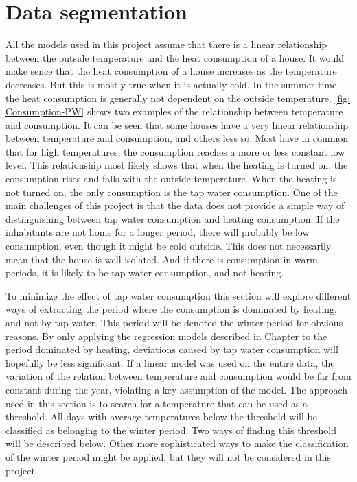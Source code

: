 \section{Data segmentation}
All the models used in this project assume that there is a linear relationship between the outside temperature and the heat consumption of a house. It would make sence that the heat consumption of a house increases as the temperature decreases. But this is mostly true when it is actually cold. In the summer time the heat consumption is generally not dependent on the outside temperature. \cref{fig: Consumption-PW} shows two examples of the relationship between temperature and consumption. It can be seen that some houses have a very linear relationship between temperature and consumption, and others less so. Most have in common that for high temperatures, the consumption reaches a more or less constant low level. This relationship most likely shows that when the heating is turned on, the consumption rises and falls with the outside temperature. When the heating is not turned on, the only consumption is the tap water consumption. One of the main challenges of this project is that the data does not provide a simple way of distinguishing between tap water consumption and heating consumption. If the inhabitants are not home for a longer period, there will probably be low consumption, even though it might be cold outside. This does not necessarily mean that the house is well isolated. And if
there is consumption in warm periods, it is likely to be tap water consumption, and not heating.

\noindent To minimize the effect of tap water consumption this section will explore different ways of extracting the period where the consumption is dominated by heating, and not by tap water. This period will be denoted the winter period for obvious reasons. By only applying the regression models described in Chapter \cite{chap: daily} to the period dominated by heating, deviations caused by tap water consumption will hopefully be less significant. If a linear model was used on the entire data, the variation of the relation between temperature and consumption would be far from constant during the year, violating a key assumption of the model. The approach used in this section is to search for a temperature that can be used as a threshold. All days with average temperatures below the threshold will be classified as belonging to the winter period. Two ways of finding this threshold will be described below. Other more sophisticated ways to make the classification of the winter period might be applied, but they will not be considered in this project.


